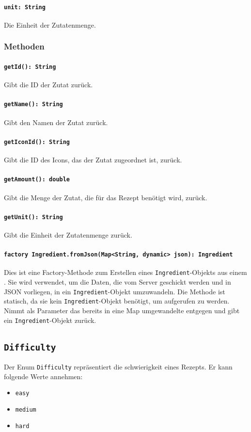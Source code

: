 \documentclass{entwurfsheft}
\begin{document}
\paragraph{\texttt{unit: String}}
Die Einheit der Zutatenmenge.

\subsubsection*{Methoden}
\paragraph{\texttt{getId(): String}}
Gibt die ID der Zutat zurück.
\paragraph{\texttt{getName(): String}}
Gibt den Namen der Zutat zurück.
\paragraph{\texttt{getIconId(): String}}
Gibt die ID des Icons, das der Zutat zugeordnet ist, zurück.
\paragraph{\texttt{getAmount(): double}}
Gibt die Menge der Zutat, die für das Rezept benötigt wird, zurück.
\paragraph{\texttt{getUnit(): String}}
Gibt die Einheit der Zutatenmenge zurück.
\paragraph{\texttt{factory Ingredient.fromJson(Map<String, dynamic> json): Ingredient}}
Dies ist eine Factory-Methode zum Erstellen eines \texttt{Ingredient}-Objekts aus einem . Sie wird verwendet, um die Daten, die vom Server geschickt werden und in \Gls{JSON} vorliegen, in ein \texttt{Ingredient}-Objekt umzuwandeln. Die Methode ist statisch, da sie kein \texttt{Ingredient}-Objekt benötigt, um aufgerufen zu werden. Nimmt als Parameter das bereits in eine Map umgewandelte  entgegen und gibt ein \texttt{Ingredient}-Objekt zurück.

\newpage
\subsection{\texttt{Difficulty}}\label{sec:difficulty}
Der Enum \texttt{Difficulty} repräsentiert die \Gls{schwierigkeit} eines Rezepts. Er kann folgende Werte annehmen:
\begin{itemize}
    \item \texttt{easy}
    \item \texttt{medium}
    \item \texttt{hard}
\end{itemize}
\newpage
\end{document}
